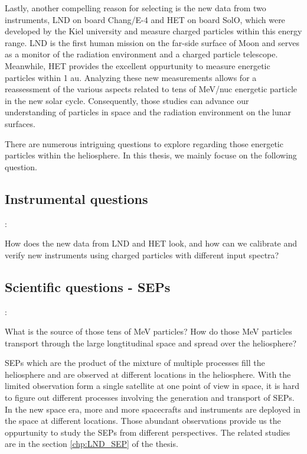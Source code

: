 Lastly, another compelling reason for selecting is the new data from two instruments, \ac{LND} on board Chang/E-4 and \ac{HET} on board \ac{SolO}, which were developed by the Kiel university and measure charged particles within this energy range. \ac{LND} is the first human mission on the far-side surface of Moon and serves as a monitor of the radiation environment and a charged particle telescope. Meanwhile, \ac{HET} provides the excellent oppurtunity to measure energetic particles within 1 au. Analyzing these new measurements allows for a reassessment of the various aspects related to tens of MeV/nuc energetic particle in the new solar cycle. Consequently, those studies can advance our understanding of particles in space and the radiation environment on the lunar surfaces.



There are numerous intriguing questions to explore regarding those energetic particles within the heliosphere. In this thesis, we mainly focuse on the following question.

\subsection*{Instrumental questions}:

How does the new data from \ac{LND} and \ac{HET} look, and how can we calibrate and verify new instruments using charged particles with different input spectra?

\subsection*{Scientific questions - \acp{SEP}}:

What is the source of those tens of MeV particles? How do those MeV particles transport through the large longtitudinal space and spread over the heliosphere?
	
\acp{SEP} which are the product of the mixture of multiple processes fill the heliosphere and are observed at different locations in the heliosphere. With the limited observation form a single satellite at one point of view in space, it is hard to figure out different processes involving the generation and transport of \acp{SEP}. In the new space era, more and more spacecrafts and instruments are deployed in the space at different locations. Those abundant observations provide us the oppurtunity to study the \acp{SEP} from different perspectives. The related studies are in the section \ref{chp:LND_SEP} of the thesis.


